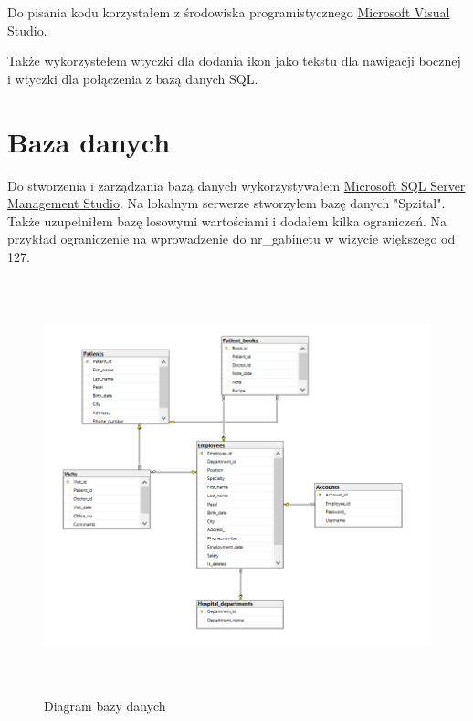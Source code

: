 Do pisania kodu korzystałem z środowiska programistycznego {\color{blue}\href{https://pl.wikipedia.org/wiki/Microsoft_Visual_Studio}{Microsoft Visual Studio}\label{href:VStudio}}.

Także wykorzystełem wtyczki \textquotedbl{} dla dodania ikon jako tekstu dla nawigacji bocznej i wtyczki \textquotedbl{} dla połączenia z bazą danych SQL.

\newpage

\section{Baza danych}

Do stworzenia i zarządzania bazą danych wykorzystywałem {\color{blue}\href{https://en.wikipedia.org/wiki/SQL_Server_Management_Studio}{Microsoft SQL Server Management Studio}}. Na lokalnym serwerze stworzyłem bazę danych "Spzital". Także uzupełniłem bazę losowymi wartościami i dodałem kilka ograniczeń. Na przykład ograniczenie na wprowadzenie do nr\_gabinetu w wizycie większego od 127.

\begin{figure}[H]
\begin{center}
    \includegraphics[height=12cm]{images/db_diagram.png}
    \caption{Diagram bazy danych}
\end{center}
\end{figure}

